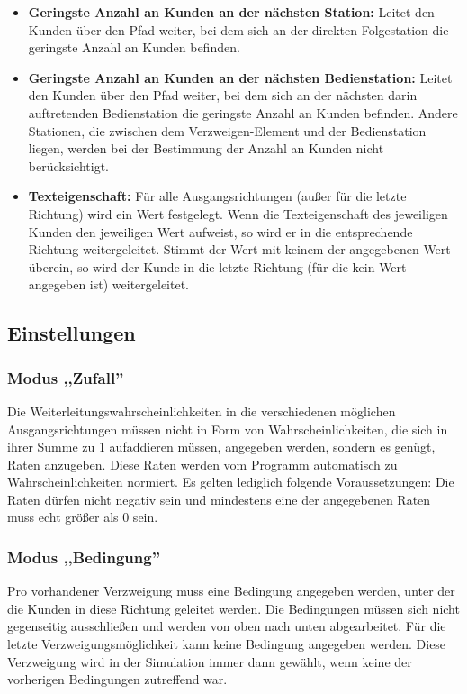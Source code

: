 \begin{itemize}
  \item 
    \textbf{Geringste Anzahl an Kunden an der nächsten Station:}
    Leitet den Kunden über den Pfad weiter, bei dem sich an der direkten Folgestation
    die geringste Anzahl an Kunden befinden.

  \item 
    \textbf{Geringste Anzahl an Kunden an der nächsten Bedienstation:}
    Leitet den Kunden über den Pfad weiter, bei dem sich an der nächsten
    darin auftretenden Bedienstation die geringste Anzahl an Kunden befinden.
    Andere Stationen, die zwischen dem Verzweigen-Element und der
    Bedienstation liegen, werden bei der Bestimmung der Anzahl an Kunden
    nicht berücksichtigt.

  \item 
    \textbf{Texteigenschaft:}
    Für alle Ausgangsrichtungen (außer für die letzte Richtung) wird ein Wert festgelegt.
    Wenn die Texteigenschaft des jeweiligen Kunden den jeweiligen Wert aufweist,
    so wird er in die entsprechende Richtung weitergeleitet.
    Stimmt der Wert mit keinem der angegebenen Wert überein,
    so wird der Kunde in die letzte Richtung (für die kein Wert angegeben ist) weitergeleitet.

\end{itemize}

\subsection*{Einstellungen}

\subsubsection*{Modus ,,Zufall''}

Die Weiterleitungswahrscheinlichkeiten in die verschiedenen möglichen Ausgangsrichtungen müssen nicht in
Form von Wahrscheinlichkeiten, die sich in ihrer Summe zu 1 aufaddieren müssen, angegeben werden, sondern
es genügt, Raten anzugeben. Diese Raten werden vom Programm automatisch zu Wahrscheinlichkeiten normiert.
Es gelten lediglich folgende Voraussetzungen: Die Raten dürfen nicht negativ sein und mindestens eine der
angegebenen Raten muss echt größer als 0 sein.

\subsubsection*{Modus ,,Bedingung''}

Pro vorhandener Verzweigung muss eine Bedingung angegeben werden, unter der die Kunden in diese Richtung
geleitet werden. Die Bedingungen müssen sich nicht gegenseitig ausschließen und werden von oben nach unten
abgearbeitet. Für die letzte Verzweigungsmöglichkeit kann keine Bedingung angegeben werden. Diese Verzweigung
wird in der Simulation immer dann gewählt, wenn keine der vorherigen Bedingungen zutreffend war.

